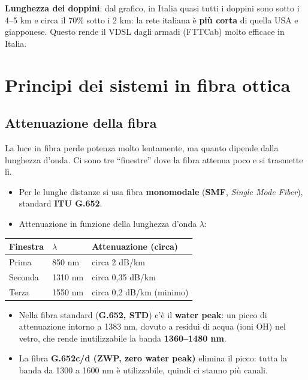 \textbf{Lunghezza dei doppini}: dal grafico, in Italia quasi tutti i doppini sono sotto i 4--5 km e circa il 70\% sotto i 2 km: la rete italiana è \textbf{più corta} di quella USA e giapponese. Questo rende il VDSL dagli armadi (FTTCab) molto efficace in Italia.

\section{Principi dei sistemi in fibra ottica}

\subsection{Attenuazione della fibra}

\begin{inbreve}

La luce in fibra perde potenza molto lentamente, ma quanto dipende dalla lunghezza d'onda. Ci sono tre ``finestre'' dove la fibra attenua poco e si trasmette lì.

\end{inbreve}

\begin{itemize}
\tightlist
\item
  Per le lunghe distanze si usa fibra \textbf{monomodale} (\textbf{SMF}, \emph{Single Mode Fiber}), standard \textbf{ITU G.652}.
\item
  Attenuazione in funzione della lunghezza d'onda \(\lambda\):
\end{itemize}

\begin{longtable}[]{@{}lll@{}}
\toprule\noalign{}
Finestra & \(\lambda\) & Attenuazione (circa) \\
\midrule\noalign{}
\endhead
\bottomrule\noalign{}
\endlastfoot
Prima & 850 nm & circa 2 dB/km \\
Seconda & 1310 nm & circa 0,35 dB/km \\
Terza & 1550 nm & circa 0,2 dB/km (minimo) \\
\end{longtable}

\begin{itemize}
\tightlist
\item
  Nella fibra standard (\textbf{G.652, STD}) c'è il \textbf{water peak}: un picco di attenuazione intorno a 1383 nm, dovuto a residui di acqua (ioni OH) nel vetro, che rende inutilizzabile la banda \textbf{1360--1480 nm}.
\item
  La fibra \textbf{G.652c/d (ZWP, zero water peak)} elimina il picco: tutta la banda da 1300 a 1600 nm è utilizzabile, quindi ci stanno più canali.
\end{itemize}

